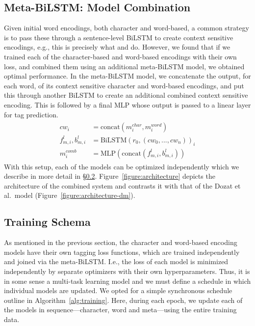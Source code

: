 \documentclass[11pt,a4paper]{article}
\begin{document}
\subsection{Meta-BiLSTM: Model Combination}

Given initial word encodings, both character and word-based, a common strategy is to pass these through a sentence-level BiLSTM to create context sensitive encodings, e.g., this is precisely what  and  do. However, we found that if we trained each of the character-based and word-based encodings with their own loss, and combined them using an additional meta-BiLSTM model, we obtained optimal performance. In the meta-BiLSTM model, we concatenate the output, for each word, of its context sensitive character and word-based encodings, and put this through another BiLSTM to create an additional combined context sensitive encoding. This is followed by a final MLP whose output is passed to a linear layer for tag prediction. 
\begin{eqnarray}
\nonumber
\left.\begin{aligned}
cw_i &=\textrm{concat}(m_i^{char}, m_i^{word})  \\ \nonumber
f_{m,i}^l, b_{m,i}^l &=\textrm{BiLSTM}(r_0,(cw_0, ..., cw_n))_i \\ \nonumber
m_i^{comb} &=\textrm{MLP}(\textrm{concat}(f_{m,i}^l, b_{m,i}^l))
\end{aligned}\right.
\end{eqnarray}
With this setup, each of the models can be optimized independently which we describe in more detail in \S\ref{sec:schema}. Figure~\ref{figure:architecture} depicts the architecture of the combined system and contrasts it with that of the Dozat et al.\ model (Figure~\ref{figure:architecture-dm}).




\subsection{Training Schema}
\label{sec:schema}

As mentioned in the previous section, the character and word-based encoding models have their own tagging loss functions, which are trained independently and joined via the meta-BiLSTM. I.e., the loss of each model is minimized independently by separate optimizers with their own hyperparameters. 
Thus, it is in some sense a multi-task learning model and we must define a schedule in which individual models are updated. We opted for a simple synchronous schedule outline in Algorithm~\ref{alg:training}. Here, during each epoch, we update each of the models in sequence---character, word and meta---using the entire training data.
\end{document}
